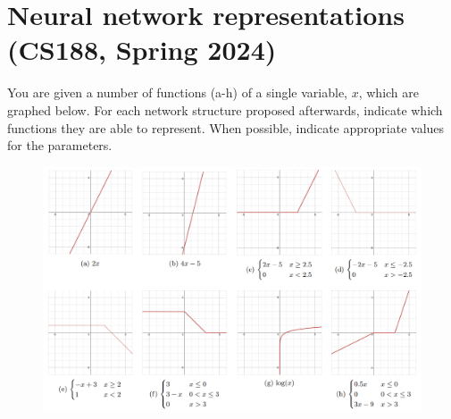\documentclass[11pt, a4paper]{article}
\begin{document}
\newpage

\section{Neural network representations (CS188, Spring 2024)}
You are given a number of functions (a-h) of a single variable, $x$, which are graphed below. For each network structure proposed afterwards, indicate which functions they are able to represent. When possible, indicate appropriate values for the parameters.

\begin{figure}[h]
    \centering
    \includegraphics[width=.9\linewidth]{figures/nnfunctions.png}
\end{figure}
\end{document}
